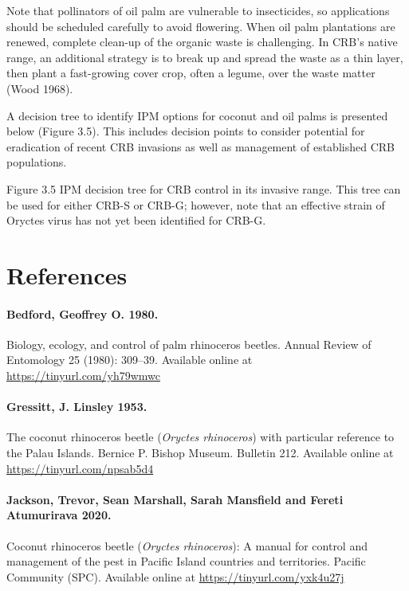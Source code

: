 \documentclass[twocolumn,letterpaper]{scrartcl}
\begin{document}
Note that pollinators of oil palm are vulnerable to insecticides, so applications 
should be scheduled carefully to avoid flowering. When oil palm plantations are renewed, complete clean-up 
of the organic waste is challenging. In CRB’s native range, an additional strategy is to break up and spread the 
waste as a thin layer, then plant a fast-growing cover crop, often a legume, over the waste matter (Wood 1968). 

A decision tree to identify IPM options for coconut and oil palms is presented below (Figure 3.5). This includes 
decision  points  to  consider  potential  for  eradication  of  recent  CRB  invasions  as  well  as  management  of 
established CRB populations. 

Figure 3.5   IPM decision tree for CRB control in its invasive range. This tree can be used for either CRB-S  
or CRB-G; however, note that an effective strain of Oryctes virus has not yet been identified for CRB-G. 

\newpage
\section*{References}

\paragraph{Bedford, Geoffrey O. 1980.} Biology, ecology, and control of palm rhinoceros beetles. Annual Review of Entomology 25 (1980): 309–39.
Available online at \url{https://tinyurl.com/yh79wmwc}

\paragraph{Gressitt, J. Linsley 1953.} The coconut rhinoceros beetle (\textit{Oryctes rhinoceros}) with particular reference to the Palau Islands. Bernice P. Bishop Museum. Bulletin 212. 
Available online at \url{https://tinyurl.com/npsab5d4}

\paragraph{Jackson, Trevor, Sean Marshall, Sarah Mansfield and Fereti Atumurirava 2020.} Coconut rhinoceros beetle (\textit{Oryctes rhinoceros}): A manual for control and management of the pest in Pacific Island countries and territories. Pacific Community (SPC). 
Available online at \url{https://tinyurl.com/yxk4u27j} 
\end{document}
